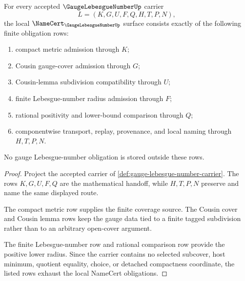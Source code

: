 \begin{theorem}
\label{thm:gauge-lebesgue-number-namecert-obligations}
For every accepted $\GaugeLebesgueNumberUp$ carrier
$$
L=(K,G,U,F,Q,H,T,P,N),
$$
the local $\NameCert_{\GaugeLebesgueNumberUp}$ surface consists exactly of the following finite obligation rows:
\begin{enumerate}
\item compact metric admission through $K$;
\item Cousin gauge-cover admission through $G$;
\item Cousin-lemma subdivision compatibility through $U$;
\item finite Lebesgue-number radius admission through $F$;
\item rational positivity and lower-bound comparison through $Q$;
\item componentwise transport, replay, provenance, and local naming through $H,T,P,N$.
\end{enumerate}
No gauge Lebesgue-number obligation is stored outside these rows.
\end{theorem}
\begin{proof}
Project the accepted carrier of \autoref{def:gauge-lebesgue-number-carrier}. The rows $K,G,U,F,Q$ are the mathematical handoff, while $H,T,P,N$ preserve and name the same displayed route.

The compact metric row supplies the finite coverage source. The Cousin cover and Cousin lemma rows keep the gauge data tied to a finite tagged subdivision rather than to an arbitrary open-cover argument.

The finite Lebesgue-number row and rational comparison row provide the positive lower radius. Since the carrier contains no selected subcover, host minimum, quotient equality, choice, or detached compactness coordinate, the listed rows exhaust the local NameCert obligations.
\end{proof}

